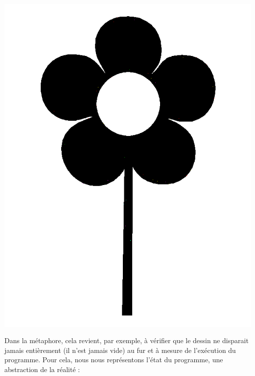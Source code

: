 \documentclass[french]{article}
\begin{document}
  \begin{center}
    \includegraphics[scale=0.19]{./pictures/flower2.png}
  \end{center}
  
  Dans la métaphore, cela revient, par exemple, à vérifier que le dessin ne disparait jamais entièrement (il n'est jamais vide) au fur et à mesure de l'exécution du programme. Pour cela, nous nous représentons l'état du programme, une abstraction de la réalité :
  
\end{document}
